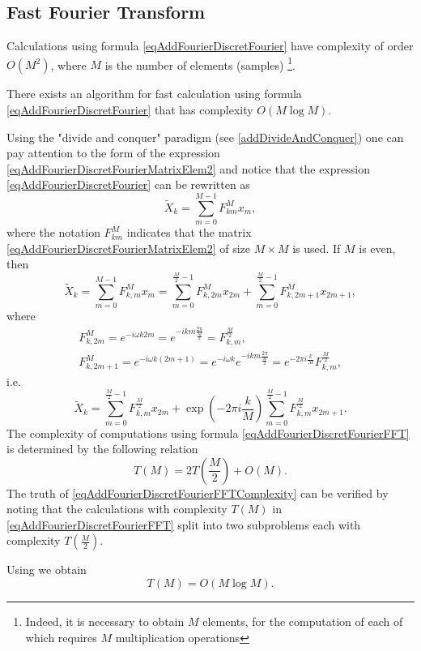 \subsection{Fast Fourier Transform}
Calculations using formula \eqref{eqAddFourierDiscretFourier} have
complexity of order $O\left(M^2\right)$, where $M$ is the number of elements (samples)
\footnote{Indeed, it is necessary to obtain $M$ elements, for
  the computation of each of which requires $M$ multiplication operations}. 

There exists an algorithm for fast calculation using formula
\eqref{eqAddFourierDiscretFourier} that has complexity
$O\left(M \log{M}\right)$.

Using the "divide and conquer" paradigm
(see \autoref{addDivideAndConquer}) one can
pay attention to the form of the expression
\eqref{eqAddFourierDiscretFourierMatrixElem2} and
notice that the expression
\eqref{eqAddFourierDiscretFourier} can be rewritten
as 
\begin{equation}
\tilde{X}_k = \sum^{M - 1}_{m = 0} F_{km}^{M} x_m,
\nonumber
\end{equation}
where the notation $F_{km}^{M}$ indicates that the matrix
\eqref{eqAddFourierDiscretFourierMatrixElem2} of size $M\times M$ is used.
If $M$ is even, then 
\begin{equation}
\tilde{X}_k = \sum^{M - 1}_{m = 0} F_{k,m}^{M} x_m = 
\sum^{\frac{M}{2} - 1}_{m = 0} F_{k,2m}^M x_{2m} +
\sum^{\frac{M}{2} - 1}_{m = 0} F_{k,2m + 1}^M x_{2m + 1},
\nonumber
\end{equation}
where
\begin{eqnarray}
F_{k,2m}^{M} = e^{-i \omega k 2m} = e^{-i k m \frac{2\pi}{\frac{M}{2}}
} = F_{k,m}^{\frac{M}{2}},
\nonumber \\
F_{k,2m + 1}^{M} = e^{-i \omega k \left(2m+1\right)} = 
e^{-i \omega k}e^{-i k m \frac{2\pi}{\frac{M}{2}}} = 
e^{-2\pi i \frac{k}{M}}F_{k,m}^{\frac{M}{2}},
\nonumber
\end{eqnarray}
i.e.
\begin{equation}
\tilde{X}_k = \sum^{\frac{M}{2} - 1}_{m = 0} F_{k,m}^{\frac{M}{2}} x_{2m} +
\exp{\left(-2\pi i \frac{k}{M}\right)}
\sum^{\frac{M}{2} - 1}_{m = 0}  F_{k,m}^{\frac{M}{2}} x_{2m + 1}.
\label{eqAddFourierDiscretFourierFFT}
\end{equation}
The complexity of computations using
formula \eqref{eqAddFourierDiscretFourierFFT} is determined by
the following relation
\begin{equation}
T\left( M \right) = 2 T\left( \frac{M}{2} \right) + O\left( M \right).
\label{eqAddFourierDiscretFourierFFTComplexity}
\end{equation}
The truth of
\eqref{eqAddFourierDiscretFourierFFTComplexity} can be verified
by noting that the calculations with complexity $T\left( M \right)$ in
\eqref{eqAddFourierDiscretFourierFFT} split
into two subproblems each with complexity $T\left( \frac{M}{2}
\right)$.

Using  we obtain
\begin{equation}
T\left( M \right) = O\left( M \log{M} \right).
\nonumber
\end{equation}


